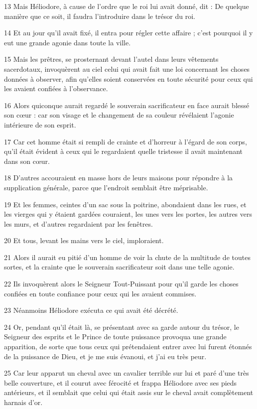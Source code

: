 \par 13 Mais Héliodore, à cause de l'ordre que le roi lui avait donné, dit : De quelque manière que ce soit, il faudra l'introduire dans le trésor du roi.
\par 14 Et au jour qu'il avait fixé, il entra pour régler cette affaire ; c'est pourquoi il y eut une grande agonie dans toute la ville.
\par 15 Mais les prêtres, se prosternant devant l'autel dans leurs vêtements sacerdotaux, invoquèrent au ciel celui qui avait fait une loi concernant les choses données à observer, afin qu'elles soient conservées en toute sécurité pour ceux qui les avaient confiées à l'observance.
\par 16 Alors quiconque aurait regardé le souverain sacrificateur en face aurait blessé son cœur : car son visage et le changement de sa couleur révélaient l'agonie intérieure de son esprit.
\par 17 Car cet homme était si rempli de crainte et d'horreur à l'égard de son corps, qu'il était évident à ceux qui le regardaient quelle tristesse il avait maintenant dans son cœur.
\par 18 D'autres accouraient en masse hors de leurs maisons pour répondre à la supplication générale, parce que l'endroit semblait être méprisable.
\par 19 Et les femmes, ceintes d'un sac sous la poitrine, abondaient dans les rues, et les vierges qui y étaient gardées couraient, les unes vers les portes, les autres vers les murs, et d'autres regardaient par les fenêtres.
\par 20 Et tous, levant les mains vers le ciel, imploraient.
\par 21 Alors il aurait eu pitié d'un homme de voir la chute de la multitude de toutes sortes, et la crainte que le souverain sacrificateur soit dans une telle agonie.
\par 22 Ils invoquèrent alors le Seigneur Tout-Puissant pour qu'il garde les choses confiées en toute confiance pour ceux qui les avaient commises.
\par 23 Néanmoins Héliodore exécuta ce qui avait été décrété.
\par 24 Or, pendant qu'il était là, se présentant avec sa garde autour du trésor, le Seigneur des esprits et le Prince de toute puissance provoqua une grande apparition, de sorte que tous ceux qui prétendaient entrer avec lui furent étonnés de la puissance de Dieu, et je me suis évanoui, et j'ai eu très peur.
\par 25 Car leur apparut un cheval avec un cavalier terrible sur lui et paré d'une très belle couverture, et il courut avec férocité et frappa Héliodore avec ses pieds antérieurs, et il semblait que celui qui était assis sur le cheval avait complètement harnais d'or.
